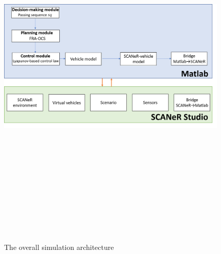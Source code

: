         \begin{figure}[!h]
        \centering 
        \includegraphics[width=11cm,height=18cm,keepaspectratio]{appendices/Slide_sup2.png}
        \caption{The overall simulation architecture  }
        \label{fig:simulation_tool2}
        \end{figure}